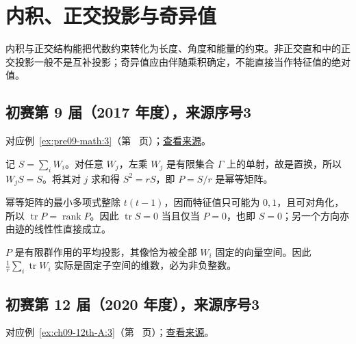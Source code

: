 \documentclass[12pt,fontset=fandol]{ctexart}
\begin{document}
\section{内积、正交投影与奇异值}

\label{sec:solutions-8}

内积与正交结构能把代数约束转化为长度、角度和能量的约束。非正交直和中的正交投影一般不是互补投影；奇异值应由伴随乘积确定，不能直接当作特征值的绝对值。

\subsection{初赛第 9 届（2017 年度），来源序号3}\label{ans:pre09-math:3}\label{pr:pre09-math:3}

对应例~\ref{ex:pre09-math:3}（第~\pageref{ex:pre09-math:3} 页）；\href{https://github.com/lzxcr/cmc-mathematics/blob/64916fa1fdbc3e444a652eca204d5669058ee321/src/problems/preliminary/09/03.md}{查看来源}。

\begin{solve}

记 $S=\sum_iW_i$。对任意 $W_j$，左乘 $W_j$ 是有限集合 $\Gamma$ 上的单射，故是置换，所以 $W_jS=S$。将其对 $j$ 求和得 $S^2=rS$，即 $P=S/r$ 是幂等矩阵。

幂等矩阵的最小多项式整除 $t(t-1)$，因而特征值只可能为 $0,1$，且可对角化，所以 $\operatorname{tr}P=\operatorname{rank}P$。因此 $\operatorname{tr}S=0$ 当且仅当 $P=0$，也即 $S=0$；另一个方向亦由迹的线性性直接成立。

\end{solve}

\begin{remark}[方法与条件]

$P$ 是有限群作用的平均投影，其像恰为被全部 $W_i$ 固定的向量空间。因此 $\frac1r\sum_i\operatorname{tr}W_i$ 实际是固定子空间的维数，必为非负整数。

\end{remark}

\subsection{初赛第 12 届（2020 年度），来源序号3}\label{ans:ch09-12th-A:3}\label{pr:ch09-12th-A:3}

对应例~\ref{ex:ch09-12th-A:3}（第~\pageref{ex:ch09-12th-A:3} 页）；\href{https://github.com/lzxcr/cmc-mathematics/blob/64916fa1fdbc3e444a652eca204d5669058ee321/src/problems/preliminary/12/03.md}{查看来源}。
\end{document}
